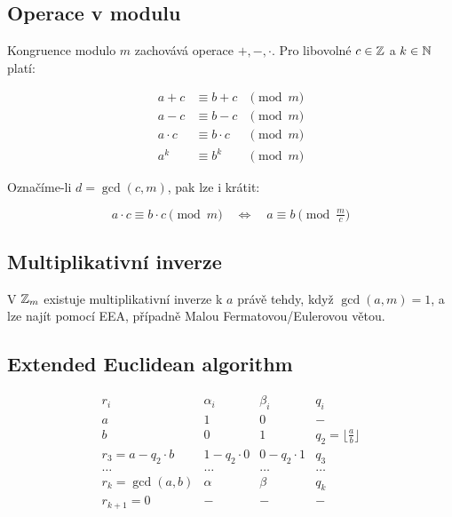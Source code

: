 \subsection{Operace v modulu}

Kongruence modulo $m$ zachovává operace $+,-,\cdot$. Pro libovolné $c \in \mathbb{Z}$ a $k \in \mathbb{N}$ platí:

\[
    \begin{array}{rll}
        a + c     & \equiv b + c     & \pmod m \\
        a - c     & \equiv b - c     & \pmod m \\
        a \cdot c & \equiv b \cdot c & \pmod m \\
        a^k       & \equiv b^k       & \pmod m
    \end{array}
\]

Označíme-li $d = \gcd(c, m)$, pak lze i krátit:

\[
    a \cdot c \equiv b \cdot c \pmod m
    \quad\Leftrightarrow\quad
    a \equiv b \pmod{\tfrac{m}{c}}
\]

\subsection{Multiplikativní inverze}

V $\mathbb{Z}_m$ existuje multiplikativní inverze k $a$ právě tehdy, když $\gcd(a,m)=1$, a lze najít pomocí EEA, případně Malou Fermatovou/Eulerovou větou.

\subsection{Extended Euclidean algorithm}

\[
    \begin{array}{c|cc|c}
        r_i              & \alpha_i    & \beta_i     & q_i                            \\[1.5mm] \hline
        a                & 1           & 0           & -                              \\[1.5mm]
        b                & 0           & 1           & q_2=\lfloor\tfrac{a}{b}\rfloor \\[1.5mm] \hline
        r_3=a-q_2\cdot b & 1-q_2\cdot0 & 0-q_2\cdot1 & q_3                            \\[1.5mm]
        \dots            & \dots       & \dots       & \dots                          \\[1.5mm]
        r_k=\gcd(a,b)    & \alpha      & \beta       & q_k                            \\[1.5mm]
        r_{k+1}=0        & -           & -           & -                              \\[1.5mm]
    \end{array}
\]

